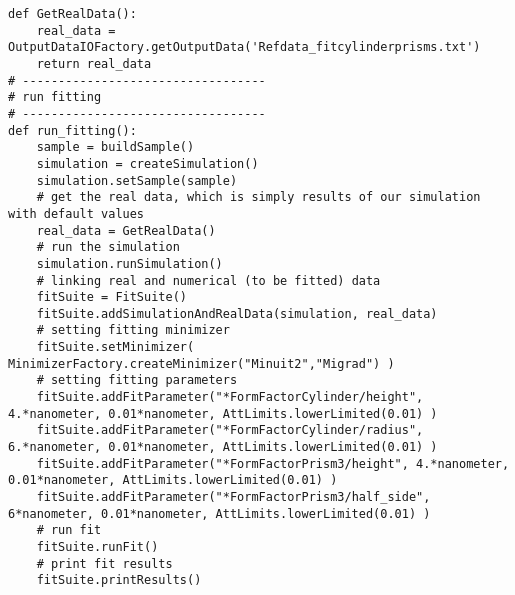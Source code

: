 \begin{lstlisting}
def GetRealData():
    real_data = OutputDataIOFactory.getOutputData('Refdata_fitcylinderprisms.txt')
    return real_data
# ----------------------------------
# run fitting 
# ----------------------------------
def run_fitting():
    sample = buildSample()
    simulation = createSimulation()
    simulation.setSample(sample)
    # get the real data, which is simply results of our simulation with default values
    real_data = GetRealData()   
    # run the simulation
    simulation.runSimulation()    
    # linking real and numerical (to be fitted) data
    fitSuite = FitSuite()
    fitSuite.addSimulationAndRealData(simulation, real_data)  
    # setting fitting minimizer
    fitSuite.setMinimizer( MinimizerFactory.createMinimizer("Minuit2","Migrad") ) 
    # setting fitting parameters
    fitSuite.addFitParameter("*FormFactorCylinder/height", 4.*nanometer, 0.01*nanometer, AttLimits.lowerLimited(0.01) )
    fitSuite.addFitParameter("*FormFactorCylinder/radius", 6.*nanometer, 0.01*nanometer, AttLimits.lowerLimited(0.01) )
    fitSuite.addFitParameter("*FormFactorPrism3/height", 4.*nanometer, 0.01*nanometer, AttLimits.lowerLimited(0.01) )
    fitSuite.addFitParameter("*FormFactorPrism3/half_side", 6*nanometer, 0.01*nanometer, AttLimits.lowerLimited(0.01) )
    # run fit
    fitSuite.runFit()
    # print fit results
    fitSuite.printResults()
\end{lstlisting}



